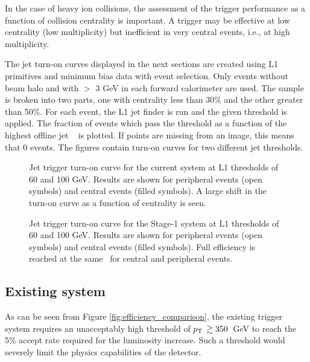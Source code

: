 In the case of heavy ion collisions, the assessment of the trigger performance
as a function of collision centrality is important. 
A trigger may be effective at low centrality (low multiplicity) but
inefficient in very central events, i.e., at high multiplicity. 

The jet turn-on curves displayed in the next sections are created using L1 primitives and
minimum bias data with event selection. 
Only events without beam halo and with $>$ 3 GeV in each forward calorimeter
are used. The sample is broken into two parts, 
one with centrality less than 30\% and the other greater than 50\%. For each
event, the L1 jet finder is run and the given threshold is applied. 
The fraction of events which pass the threshold as a function of the highest
offline jet \pt\ 
 is plotted. If points are missing from an image, this means that 0 events. The figures contain
 turn-on curves for two different jet thresholds.

\begin{figure}[htbp]
\begin{center}
\caption{Jet trigger turn-on curve for the current system at L1 thresholds of 60 and 100
GeV. Results are shown for peripheral events (open symbols) and central events (filled symbols).
A large shift in the turn-on curve as a function of centrality is seen.}
\label{fig:jetto_current}
\end{center}
\end{figure}

\begin{figure}[htbp]
\begin{center}
\caption{Jet trigger turn-on curve for the Stage-1 system at L1 thresholds of 60 and 100
GeV. Results are shown for peripheral events (open symbols) and central events (filled symbols).
Full efficiency is reached at the same \pt\ for central and peripheral events.}
\label{fig:jetto_2015}
\end{center}
\end{figure}

\subsection{Existing system}

As can be seen from Figure \ref{fig:efficiency_comparison}, the existing
trigger system requires an unacceptably high threshold of $p_{\rm T}\, \gtrsim 350$~GeV to 
reach the 5\% accept rate required for the luminosity increase. Such a
threshold would severely limit the physics capabilities of the detector. 

